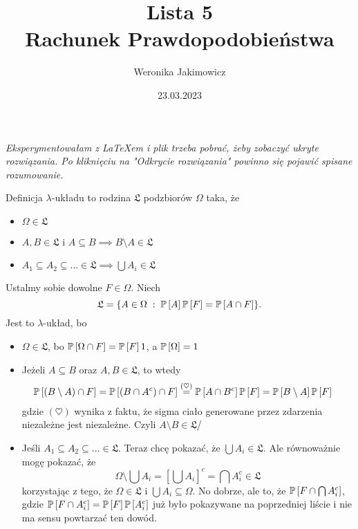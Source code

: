 \documentclass{article}
\title{Lista 5\smallskip\\{\normalsize Rachunek Prawdopodobieństwa}}
\author{Weronika Jakimowicz}
\date{23.03.2023}
\begin{document}
\maketitle
\thispagestyle{empty}

\begin{center}
\slshape Eksperymentowałam z LaTeXem i plik trzeba pobrać, żeby zobaczyć ukryte rozwiązania. Po kliknięciu na "Odkrycie rozwiązania" powinno się pojawić spisane rozumowanie.
\end{center}


Definicja $\lambda$-układu to rodzina $\mathfrak{L}$ podzbiorów $\Omega$ taka, że
\begin{itemize}
  \item $\Omega\in\mathfrak{L}$
  \item $A,B\in\mathfrak{L}$ i $A\subseteq B\implies B\setminus A\in\mathfrak{L}$
  \item $A_1\subseteq A_2\subseteq...\in \mathfrak{L}\implies\bigcup A_i\in\mathfrak{L}$
\end{itemize}


Ustalmy sobie dowolne $F\in\Omega$. Niech 
$$\mathfrak{L}=\{A\in\Omega\;:\;\prob{A}\prob{F}=\prob{A\cap F}\}.$$
Jest to $\lambda$-układ, bo
\begin{itemize}
    \item $\Omega\in\mathfrak{L}$, bo $\prob{\Omega\cap F}=\prob{F}1$, a $\prob{\Omega}=1$
  \item Jeżeli $A\subseteq B$ oraz $A,B\in\mathfrak{L}$, to wtedy
  \begin{align*}
     \prob{(B\setminus A)\cap F}&=\prob{(B\cap A^c)\cap F}\overset{(\heartsuit)}{=}\prob{A\cap B^c}\prob{F}=\prob{B\setminus A}\prob{F}
  \end{align*}
  gdzie $(\heartsuit)$ wynika z faktu, że sigma ciało generowane przez zdarzenia niezależne jest niezależne. Czyli $A\setminus B\in\mathfrak{L}$/
   \item Jeśli $A_1\subseteq A_2\subseteq...\in\mathfrak{L}$. Teraz chcę pokazać, że $\bigcup A_i\in\mathfrak{L}$. Ale równoważnie mogę pokazać, że 
   $$\Omega\setminus\bigcup A_i=\left[\bigcup A_i\right]^c=\bigcap A_i^c\in\mathfrak{L}$$
   korzystając z tego, że $\Omega\in\mathfrak{L}$ i $\bigcup A_i\subseteq \Omega$. No dobrze, ale to, że $\prob{F\cap\bigcap A_i^c}$, gdzie $\prob{F\cap A_i^c}=\prob{F}\prob{A_i^c}$ już było pokazywane na poprzedniej liście i nie ma sensu powtarzać ten dowód.
\end{itemize}
\end{document}
